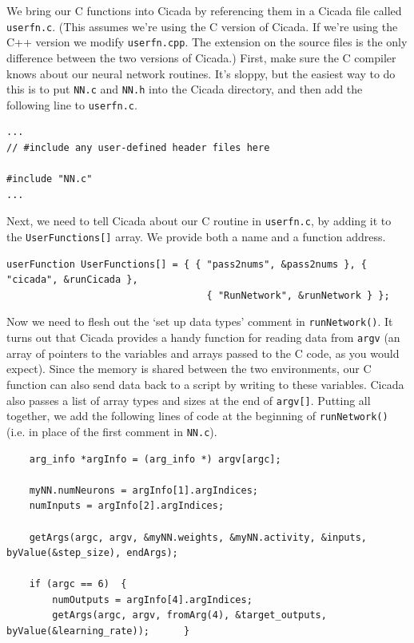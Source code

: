 \documentclass{article}
\newenvironment{code}{
       \begin{list}{}{
               \setlength{\leftmargin}{.4in}
               \setlength{\rightmargin}{0in}
               \setlength{\topsep}{.2in}
       }
       \small
       \item[] }
       { \end{list}   }
\begin{document}
We bring our C functions into Cicada by referencing them in a Cicada file called \verb#userfn.c#.  (This assumes we're using the C version of Cicada.  If we're using the C++ version we modify \verb#userfn.cpp#.  The extension on the source files is the only difference between the two versions of Cicada.)  First, make sure the C compiler knows about our neural network routines.  It's sloppy, but the easiest way to do this is to put \verb#NN.c# and \verb#NN.h# into the Cicada directory, and then add the following line to \verb#userfn.c#.

\begin{code} \begin{verbatim}
...
// #include any user-defined header files here

#include "NN.c"
...
\end{verbatim} \end{code}

\noindent Next, we need to tell Cicada about our C routine in \verb#userfn.c#, by adding it to the \verb#UserFunctions[]# array.  We provide both a name and a function address.

\begin{code} \begin{verbatim}
userFunction UserFunctions[] = { { "pass2nums", &pass2nums }, { "cicada", &runCicada },
                                   { "RunNetwork", &runNetwork } };
\end{verbatim} \end{code}

Now we need to flesh out the `set up data types' comment in \verb#runNetwork()#.  It turns out that Cicada provides a handy function for reading data from \verb#argv# (an array of pointers to the variables and arrays passed to the C code, as you would expect).  Since the memory is shared between the two environments, our C function can also send data back to a script by writing to these variables.  Cicada also passes a list of array types and sizes at the end of \verb#argv[]#.  Putting all together, we add the following lines of code at the beginning of \verb#runNetwork()# (i.e. in place of the first comment in \verb#NN.c#).


\begin{code} \begin{verbatim}
    arg_info *argInfo = (arg_info *) argv[argc];
    
    myNN.numNeurons = argInfo[1].argIndices;
    numInputs = argInfo[2].argIndices;
    
    getArgs(argc, argv, &myNN.weights, &myNN.activity, &inputs, byValue(&step_size), endArgs);
    
    if (argc == 6)  {
        numOutputs = argInfo[4].argIndices;
        getArgs(argc, argv, fromArg(4), &target_outputs, byValue(&learning_rate));      }
\end{verbatim} \end{code}
\end{document}
